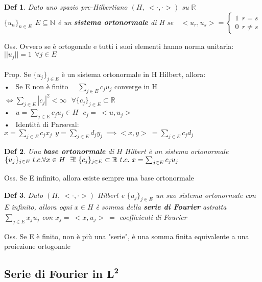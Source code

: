 \documentclass{article}
\theoremstyle{unnumbered}
\newtheorem* {theoremT}{Def}
\theoremstyle{unnumbered1}
\newenvironment{defi}{\begin{gBox}\begin{theoremT}}{\end{theoremT}\end{gBox}}
\begin{document}
\begin{defi}
Dato uno spazio pre-Hilbertiano $(H, \ <\cdot,\cdot>)$ su $\mathbb{R}$ \\ $\{u_n\}_{n\in E} \ \ E\subseteq \mathbb{N}$ è un \textbf{sistema ortonormale} di H se\ \  $<u_r,u_s>=\begin{cases}1 \ \ r=s \\ 0 \ \ r\ne s\end{cases}$
\end{defi}
%
Oss. Ovvero se è ortogonale e tutti i suoi elementi hanno norma unitaria: \ $||u_j||=1 \ \ \forall j\in E$\\ \\
%
Prop. Se $\{u_j\}_{j\in E}$ è un sistema ortonormale in H Hilbert, allora:\\
• \ Se E non è finito \ \ $\sum_{j\in E}c_ju_j$ converge in H $\Leftrightarrow \sum_{j\in E}|c_j|^2<\infty \ \ \ \forall\{c_j\}_{j\in E}\subset\mathbb{R}$\\
• \ $u=\sum_{j\in E}c_ju_j \in H \ \ \ c_j=\ <u,u_j>$\\
• \ Identità di Parseval: \ $x=\sum_{j\in E}c_jx_j \ \ y=\sum_{j\in E}d_jy_j \ \implies <x,y>\ =\sum_{j\in E}c_jd_j$\\


\begin{defi}
Una \textbf{base ortonormale} di $H$ Hilbert è un sistema ortonormale $\{u_j\}_{j\in E} \ t.c. \\ \forall x\in H \ \ \exists ! \ \{c_j\}_{j\in E}\subset\mathbb{R} \ t.c. \ x=\sum_{j\in E} c_ju_j$
\end{defi}
%
Oss. Se E infinito, allora esiste sempre una base ortonormale\\

\begin{defi}
Dato $(H, \ <\cdot,\cdot>)$ Hilbert e $\{u_j\}_{j\in E}$ un suo sistema ortonormale con E infinito, allora ogni $x\in H$ è somma della \textbf{serie di Fourier} astratta $\sum_{j\in E}x_ju_j$ con $x_j= \ <x,u_j> \ =$ coefficienti di Fourier
\end{defi}
%
Oss. Se E è finito, non è più una "serie", è una somma finita equivalente a una proiezione ortogonale\\


\subsection{Serie di Fourier in $\mathbf{L^2}$}
\end{document}
